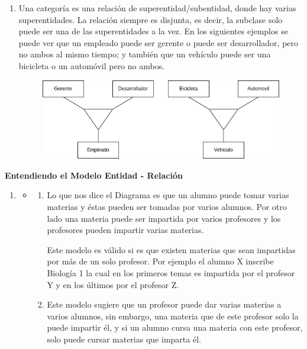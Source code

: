 \documentclass{exam}
\begin{document}
\begin{questions}
\begin{enumerate}[label=\alph*.]
	    \item Una categoría es una relación de superentidad/subentidad, donde hay varias superentidades. La relación siempre es
disjunta, es decir, la subclase solo puede ser una de las superentidades a la vez. En los siguientes ejemplos se puede ver que un empleado puede ser gerente o puede ser desarrollador, pero no ambos al mismo tiempo; y también que un vehículo puede ser una bicicleta o un automóvil pero no ambos.
		\begin{figure}[h!]
	        \centering
	        \includegraphics[width=11cm]{imgNolasco/5.png}
	    \end{figure}
	    
	\end{enumerate}
	
	\question \textbf{Entendiendo el Modelo Entidad - Relación}
	
	\begin{enumerate}[label=\roman*]
	    \item 
	    \begin{itemize}
	        \item
	        \begin{enumerate}[label=\alph*]
	        \item Lo que nos dice el Diagrama es que un alumno puede tomar varias materias y éstas pueden ser tomadas por varios alumnos. Por otro lado una materia puede ser impartida por varios profesores y los profesores pueden impartir varias materias.
	        
	        Este modelo es válido si es que existen materias que sean impartidas por más de un solo profesor. Por ejemplo el alumno X inscribe Biología 1 la cual en los primeros temas es impartida por el profesor Y y en los últimos por el profesor Z.
	        
	        \item Este modelo sugiere que un profesor puede dar varias materias a varios alumnos, sin embargo, una materia que de este profesor solo la puede impartir él, y si un alumno cursa una materia con este profesor, solo puede cursar materias que imparta él.
	        

\end{enumerate}
\end{itemize}
\end{enumerate}
\end{questions}
\end{document}
